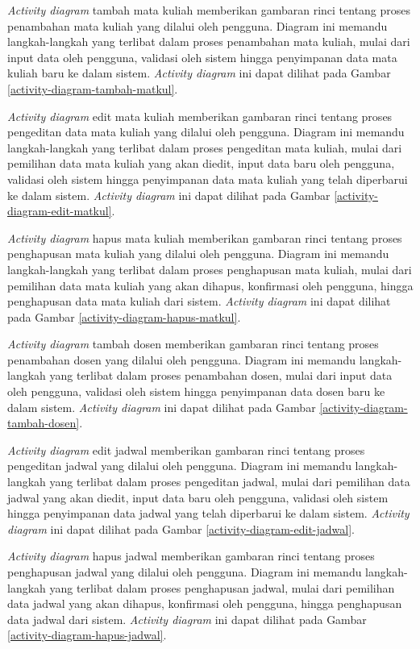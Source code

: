 \textit{Activity diagram} tambah mata kuliah memberikan gambaran rinci tentang proses penambahan mata kuliah yang dilalui oleh pengguna. Diagram ini memandu langkah-langkah yang terlibat dalam proses penambahan mata kuliah, mulai dari input data oleh pengguna, validasi oleh sistem hingga penyimpanan data mata kuliah baru ke dalam sistem. \textit{Activity diagram} ini dapat dilihat pada Gambar \ref{activity-diagram-tambah-matkul}.


\textit{Activity diagram} edit mata kuliah memberikan gambaran rinci tentang proses pengeditan data mata kuliah yang dilalui oleh pengguna. Diagram ini memandu langkah-langkah yang terlibat dalam proses pengeditan mata kuliah, mulai dari pemilihan data mata kuliah yang akan diedit, input data baru oleh pengguna, validasi oleh sistem hingga penyimpanan data mata kuliah yang telah diperbarui ke dalam sistem. \textit{Activity diagram} ini dapat dilihat pada Gambar \ref{activity-diagram-edit-matkul}.


\textit{Activity diagram} hapus mata kuliah memberikan gambaran rinci tentang proses penghapusan mata kuliah yang dilalui oleh pengguna. Diagram ini memandu langkah-langkah yang terlibat dalam proses penghapusan mata kuliah, mulai dari pemilihan data mata kuliah yang akan dihapus, konfirmasi oleh pengguna, hingga penghapusan data mata kuliah dari sistem. \textit{Activity diagram} ini dapat dilihat pada Gambar \ref{activity-diagram-hapus-matkul}.


\textit{Activity diagram} tambah dosen memberikan gambaran rinci tentang proses penambahan dosen yang dilalui oleh pengguna. Diagram ini memandu langkah-langkah yang terlibat dalam proses penambahan dosen, mulai dari input data oleh pengguna, validasi oleh sistem hingga penyimpanan data dosen baru ke dalam sistem. \textit{Activity diagram} ini dapat dilihat pada Gambar \ref{activity-diagram-tambah-dosen}.


\textit{Activity diagram} edit jadwal memberikan gambaran rinci tentang proses pengeditan jadwal yang dilalui oleh pengguna. Diagram ini memandu langkah-langkah yang terlibat dalam proses pengeditan jadwal, mulai dari pemilihan data jadwal yang akan diedit, input data baru oleh pengguna, validasi oleh sistem hingga penyimpanan data jadwal yang telah diperbarui ke dalam sistem. \textit{Activity diagram} ini dapat dilihat pada Gambar \ref{activity-diagram-edit-jadwal}.


\textit{Activity diagram} hapus jadwal memberikan gambaran rinci tentang proses penghapusan jadwal yang dilalui oleh pengguna. Diagram ini memandu langkah-langkah yang terlibat dalam proses penghapusan jadwal, mulai dari pemilihan data jadwal yang akan dihapus, konfirmasi oleh pengguna, hingga penghapusan data jadwal dari sistem. \textit{Activity diagram} ini dapat dilihat pada Gambar \ref{activity-diagram-hapus-jadwal}.


